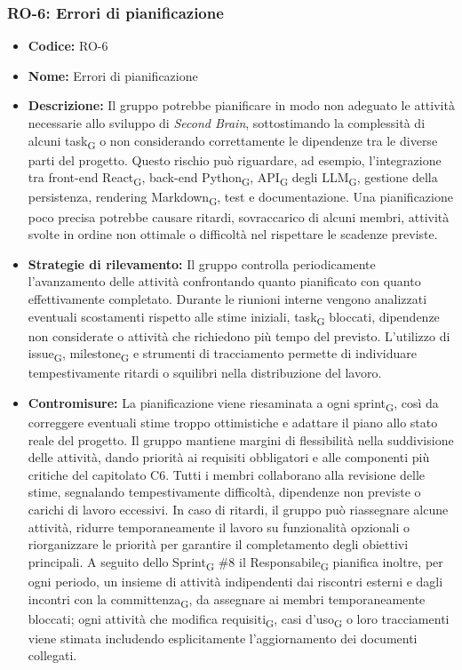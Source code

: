 ﻿\documentclass[a4paper, 10pt, colorlinks=true, linkcolor=black, urlcolor=blue, citecolor=blue, hidelinks]{article}
\begin{document}
\subsubsection{RO-6: Errori di pianificazione}

\begin{itemize}
    \item \textbf{Codice:} RO-6

    \item \textbf{Nome:} Errori di pianificazione

    \item \textbf{Descrizione:} Il gruppo potrebbe pianificare in modo non adeguato le attività necessarie allo sviluppo di \textit{Second Brain}, sottostimando la complessità di alcuni task\textsubscript{G} o non considerando correttamente le dipendenze tra le diverse parti del progetto. Questo rischio può riguardare, ad esempio, l'integrazione tra front-end React\textsubscript{G}, back-end Python\textsubscript{G}, API\textsubscript{G} degli LLM\textsubscript{G}, gestione della persistenza, rendering Markdown\textsubscript{G}, test e documentazione. Una pianificazione poco precisa potrebbe causare ritardi, sovraccarico di alcuni membri, attività svolte in ordine non ottimale o difficoltà nel rispettare le scadenze previste.

    \item \textbf{Strategie di rilevamento:} Il gruppo controlla periodicamente l'avanzamento delle attività confrontando quanto pianificato con quanto effettivamente completato. Durante le riunioni interne vengono analizzati eventuali scostamenti rispetto alle stime iniziali, task\textsubscript{G} bloccati, dipendenze non considerate o attività che richiedono più tempo del previsto. L'utilizzo di issue\textsubscript{G}, milestone\textsubscript{G} e strumenti di tracciamento permette di individuare tempestivamente ritardi o squilibri nella distribuzione del lavoro.

    \item \textbf{Contromisure:} La pianificazione viene riesaminata a ogni sprint\textsubscript{G}, così da correggere eventuali stime troppo ottimistiche e adattare il piano allo stato reale del progetto. Il gruppo mantiene margini di flessibilità nella suddivisione delle attività, dando priorità ai requisiti obbligatori e alle componenti più critiche del capitolato C6. Tutti i membri collaborano alla revisione delle stime, segnalando tempestivamente difficoltà, dipendenze non previste o carichi di lavoro eccessivi. In caso di ritardi, il gruppo può riassegnare alcune attività, ridurre temporaneamente il lavoro su funzionalità opzionali o riorganizzare le priorità per garantire il completamento degli obiettivi principali. A seguito dello Sprint\textsubscript{G} \#8 il Responsabile\textsubscript{G} pianifica inoltre, per ogni periodo, un insieme di attività indipendenti dai riscontri esterni e dagli incontri con la committenza\textsubscript{G}, da assegnare ai membri temporaneamente bloccati; ogni attività che modifica requisiti\textsubscript{G}, casi d'uso\textsubscript{G} o loro tracciamenti viene stimata includendo esplicitamente l'aggiornamento dei documenti collegati.


\end{itemize}
\end{document}

